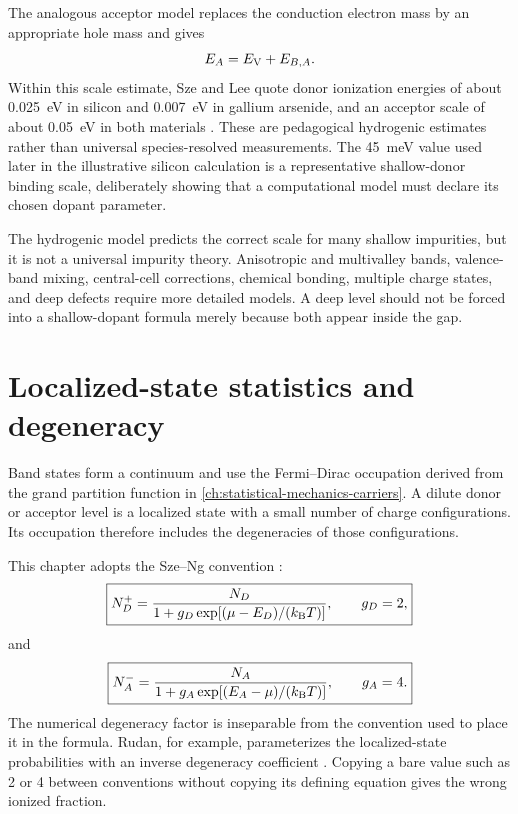 The analogous acceptor model replaces the conduction electron mass by an
appropriate hole mass and gives
\begin{equation}
  E_A=E_{\mathrm V}+E_{B,A}.
  \label{eq:acceptor-level-from-binding-energy}
\end{equation}
Within this scale estimate, Sze and Lee quote donor ionization energies of about
\SI{0.025}{\electronvolt} in silicon and \SI{0.007}{\electronvolt} in gallium
arsenide, and an acceptor scale of about \SI{0.05}{\electronvolt} in both
materials \cite[Sec.~1.6.1]{szeLee2012}.  These are pedagogical hydrogenic
estimates rather than universal species-resolved measurements.  The
\SI{45}{\milli\electronvolt} value used later in the illustrative silicon
calculation is a representative shallow-donor binding scale, deliberately
showing that a computational model must declare its chosen dopant parameter.

\begin{boundarybox}
The hydrogenic model predicts the correct scale for many shallow impurities,
but it is not a universal impurity theory.  Anisotropic and multivalley bands,
valence-band mixing, central-cell corrections, chemical bonding, multiple
charge states, and deep defects require more detailed models.  A deep level
should not be forced into a shallow-dopant formula merely because both appear
inside the gap.
\end{boundarybox}

\section{Localized-state statistics and degeneracy}

Band states form a continuum and use the Fermi--Dirac occupation derived from
the grand partition function in \cref{ch:statistical-mechanics-carriers}.  A
dilute donor or acceptor level is a
localized state with a small number of charge configurations.  Its occupation
therefore includes the degeneracies of those configurations.

This chapter adopts the Sze--Ng convention
\cite[Sec.~1.4.3]{szeNg2007}:
\begin{equation}
  \boxed{
  N_D^+
  =\frac{N_D}
   {1+g_D\exp[(\mu-E_D)/(k_{\mathrm B} T)]},
  \qquad g_D=2,
  }
  \label{eq:ionized-donor-concentration}
\end{equation}
and
\begin{equation}
  \boxed{
  N_A^-
  =\frac{N_A}
   {1+g_A\exp[(E_A-\mu)/(k_{\mathrm B} T)]},
  \qquad g_A=4.
  }
  \label{eq:ionized-acceptor-concentration}
\end{equation}
The numerical degeneracy factor is inseparable from the convention used to
place it in the formula.  Rudan, for example, parameterizes the localized-state
probabilities with an inverse degeneracy coefficient
\cite[Secs.~18.4.1--18.4.2]{rudan2015}.  Copying a bare value such as 2 or 4
between conventions without copying its defining equation gives the wrong
ionized fraction.

